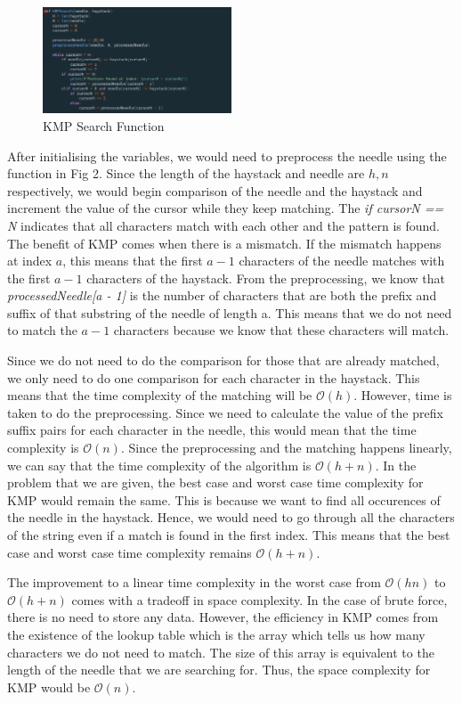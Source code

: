 \begin{figure}[h!]
    \centering
    \includegraphics[width=0.50\textwidth]{images/KMP.png}
    \caption{KMP Search Function}
\end{figure}

After initialising the variables, we would need to preprocess the needle using the function in Fig 2. Since the length of the haystack and needle are $h, n$ respectively, we would begin comparison of the needle and the haystack and increment the value of the cursor while they keep matching. The \emph{if cursorN == N} indicates that all characters match with each other and the pattern is found. The benefit of KMP comes when there is a mismatch. If the mismatch happens at index $a$, this means that the first $a - 1$ characters of the needle matches with the first $a - 1$ characters of the haystack. From the preprocessing, we know that \emph{processedNeedle[a - 1]} is the number of characters that are both the prefix and suffix of that substring of the needle of length a. This means that we do not need to match the $a - 1$ characters because we know that these characters will match.

Since we do not need to do the comparison for those that are already matched, we only need to do one comparison for each character in the haystack. This means that the time complexity of the matching will be $\mathcal{O}(h)$. However, time is taken to do the preprocessing. Since we need to calculate the value of the prefix suffix pairs for each character in the needle, this would mean that the time complexity is $\mathcal{O}(n)$. Since the preprocessing and the matching happens linearly, we can say that the time complexity of the algorithm is $\mathcal{O}(h+n)$. In the problem that we are given, the best case and worst case time complexity for KMP would remain the same. This is because we want to find all occurences of the needle in the haystack. Hence, we would need to go through all the characters of the string even if a match is found in the first index. This means that the best case and worst case time complexity remains $\mathcal{O}(h+n)$.

The improvement to a linear time complexity in the worst case from $\mathcal{O}(hn)$ to $\mathcal{O}(h + n)$ comes with a tradeoff in space complexity. In the case of brute force, there is no need to store any data. However, the efficiency in KMP comes from the existence of the lookup table which is the array which tells us how many characters we do not need to match. The size of this array is equivalent to the length of the needle that we are searching for. Thus, the space complexity for KMP would be $\mathcal{O}(n)$.

